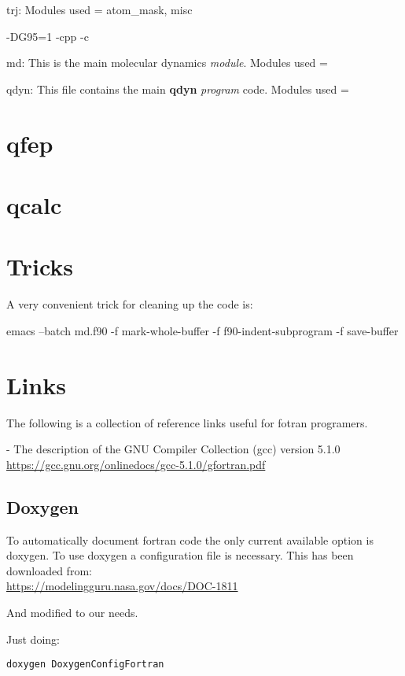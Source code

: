 \documentclass[10pt, oneside, pdftex]{article}
\begin{document}
trj:
Modules used = atom\_mask, misc




-DG95=1 -cpp -c

md: This is the main molecular dynamics \textit{module}.
Modules used =


qdyn: This file contains the main \textbf{qdyn} \textit{program} code.
Modules used =



\section{qfep}
\label{qfep}


\section{qcalc}
\label{qcalc}


\section{Tricks}
\label{tricks}

A very convenient trick for cleaning up the code is:

emacs --batch md.f90 -f mark-whole-buffer -f f90-indent-subprogram -f save-buffer


\section{Links}
\label{links}
The following  is a  collection of reference  links useful  for fotran
programers.


\noindent - The description of the GNU Compiler Collection (gcc) version 5.1.0\\
\url{https://gcc.gnu.org/onlinedocs/gcc-5.1.0/gfortran.pdf}


\subsection{Doxygen}
\label{doxygen}
To  automatically document  fortran  code the  only current  available
option is doxygen.
To  use doxygen  a  configuration  file is  necessary.  This has  been
downloaded from:\\

\url{https://modelingguru.nasa.gov/docs/DOC-1811}

And modified to our needs.

Just doing:

\begin{lstlisting}
doxygen DoxygenConfigFortran
\end{lstlisting}
\end{document}
